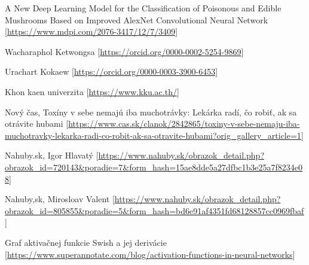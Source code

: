 \documentclass[journal,onecolumn]{IEEEtran}
\begin{document}
\ifCLASSOPTIONcaptionsoff
  \newpage
\fi

\begin{thebibliography}{4}

A New Deep Learning Model for the Classification of
Poisonous and Edible Mushrooms Based on Improved AlexNet
Convolutional Neural Network [\url{https://www.mdpi.com/2076-3417/12/7/3409}]

Wacharaphol Ketwongsa [\url{https://orcid.org/0000-0002-5254-9869}]

Urachart Kokaew [\url{https://orcid.org/0000-0003-3900-6453}]

Khon kaen univerzita [\url{https://www.kku.ac.th/}]

Nový čas, Toxíny v sebe nemajú iba muchotrávky: Lekárka radí, čo robiť, ak sa otrávite hubami [\url{https://www.cas.sk/clanok/2842865/toxiny-v-sebe-nemaju-iba-muchotravky-lekarka-radi-co-robit-ak-sa-otravite-hubami?orig_gallery_article=1}]

Nahuby.sk, Igor Hlavatý [\url{https://www.nahuby.sk/obrazok_detail.php?obrazok_id=720143&poradie=7&form_hash=15ae8dde5a27dfbc1b3e25a7f8234e08}]

Nahuby,sk, Mirosloav Valent [\url{https://www.nahuby.sk/obrazok_detail.php?obrazok_id=805855&poradie=5&form_hash=bd6e91af4351fd68128857cc0969fbaf}]

Graf aktivačnej funkcie Swish a jej derivácie [\url{https://www.superannotate.com/blog/activation-functions-in-neural-networks}]

\end{thebibliography}
\end{document}
